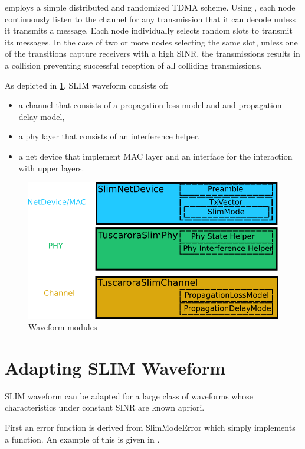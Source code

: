 
 employs a simple distributed and randomized TDMA scheme. 
Using , each node continuously listen to the channel for any transmission that it can decode unless it transmits a message. 
Each node individually selects random slots to transmit its messages.
In the case of two or more nodes selecting the same slot, unless one of the transitions capture receivers with a high SINR, the transmissions results in a collision preventing successful reception of all colliding transmissions.

As depicted in \cref{Fig:WaveformModules}, SLIM waveform consists of:
\begin{itemize}
\item a channel that consists of a propagation loss model and and propagation delay model,
\item a phy layer that consists of an interference helper,
\item a net device that implement MAC layer and an interface for the interaction with upper layers.
\end{itemize}

\begin{figure}[h]
 \centering
 \includegraphics[width=0.9\linewidth]{figures/SLIM_Modules}
 \caption{Waveform modules}
 \label{Fig:WaveformModules}
\end{figure}

\section{Adapting SLIM Waveform}

SLIM waveform can be adapted for a large class of waveforms whose characteristics under constant SINR are known apriori. 

First an error function is derived from SlimModeError which simply implements a  function. An example of this is given in . 


